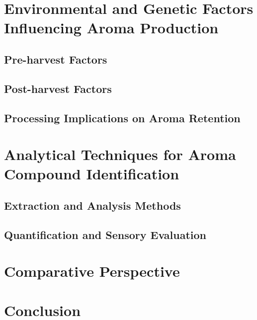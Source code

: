 \section{Environmental and Genetic Factors Influencing Aroma Production}
\subsection{Pre-harvest Factors}
\subsection{Post-harvest Factors}
\subsection{Processing Implications on Aroma Retention}


\section{Analytical Techniques for Aroma Compound Identification}
\subsection{Extraction and Analysis Methods}
\subsection{Quantification and Sensory Evaluation}

\section{Comparative Perspective}

\section{Conclusion}
